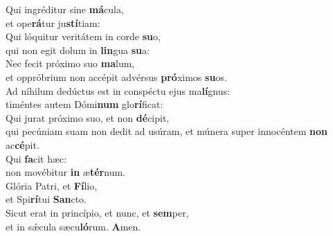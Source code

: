 \evenverse Qui ingréditur sine \textbf{má}cula,~\*\\
\evenverse et ope\textbf{rá}tur ju\textbf{stí}tiam:\\
\oddverse Qui lóquitur veritátem in corde \textbf{su}o,~\*\\
\oddverse qui non egit dolum in \textbf{lin}gua \textbf{su}a:\\
\evenverse Nec fecit próximo suo \textbf{ma}lum,~\*\\
\evenverse et oppróbrium non accépit advérsus \textbf{pró}ximos \textbf{su}os.\\
\oddverse Ad níhilum dedúctus est in conspéctu ejus ma\textbf{lí}gnus:~\*\\
\oddverse timéntes autem Dómi\textbf{num} glo\textbf{rí}ficat:\\
\evenverse Qui jurat próximo suo, et non \textbf{dé}cipit,~\*\\
\evenverse qui pecúniam suam non dedit ad usúram, et múnera super innocéntem \textbf{non} ac\textbf{cé}pit.\\
\oddverse Qui \textbf{fa}cit hæc:~\*\\
\oddverse non movébitur \textbf{in} æ\textbf{tér}num.\\
\evenverse Glória Patri, et \textbf{Fí}lio,~\*\\
\evenverse et Spi\textbf{rí}tui \textbf{San}cto.\\
\oddverse Sicut erat in princípio, et nunc, et \textbf{sem}per,~\*\\
\oddverse et in sǽcula sæcu\textbf{ló}rum. \textbf{A}men.\\
